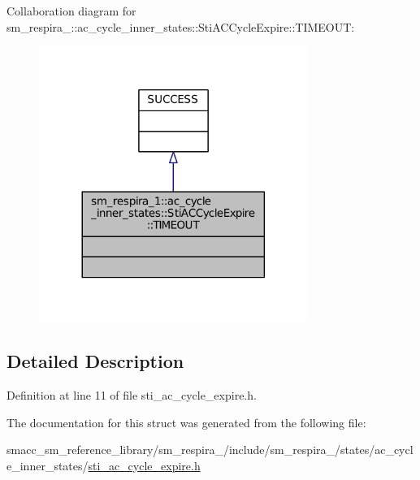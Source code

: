Collaboration diagram for sm\+\_\+respira\+\_\+:\+:ac\+\_\+cycle\+\_\+inner\+\_\+states\+:\+:Sti\+A\+C\+Cycle\+Expire\+:\+:T\+I\+M\+E\+O\+UT\+:
\nopagebreak
\begin{figure}[H]
\begin{center}
\leavevmode
\includegraphics[width=248pt]{structsm__respira__1_1_1ac__cycle__inner__states_1_1StiACCycleExpire_1_1TIMEOUT__coll__graph}
\end{center}
\end{figure}


\subsection{Detailed Description}


Definition at line 11 of file sti\+\_\+ac\+\_\+cycle\+\_\+expire.\+h.



The documentation for this struct was generated from the following file\+:\begin{DoxyCompactItemize}
\item 
smacc\+\_\+sm\+\_\+reference\+\_\+library/sm\+\_\+respira\+\_/include/sm\+\_\+respira\+\_/states/ac\+\_\+cycle\+\_\+inner\+\_\+states/\hyperlink{sti__ac__cycle__expire_8h}{sti\+\_\+ac\+\_\+cycle\+\_\+expire.\+h}\end{DoxyCompactItemize}
